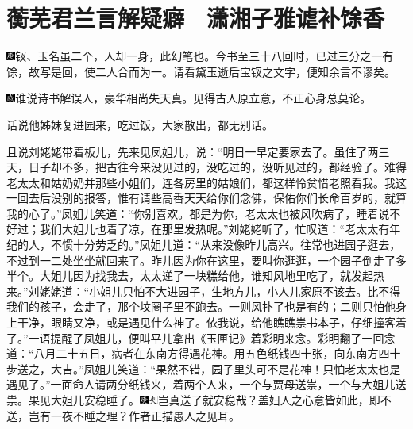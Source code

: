 

\chapter{蘅芜君兰言解疑癖　潇湘子雅谑补馀香}\label{part0046_split_000.htmlux5cux23calibre_pb_0}

{\includegraphics[width=3mm]{../Images/00004}钗、玉名虽二个，人却一身，此幻笔也。今书至三十八回时，已过三分之一有馀，故写是回，使二人合而为一。请看黛玉逝后宝钗之文字，便知余言不谬矣。}

{\includegraphics[width=3mm]{../Images/00005}谁说诗书解误人，豪华相尚失天真。见得古人原立意，不正心身总莫论。}

话说他姊妹复进园来，吃过饭，大家散出，都无别话。

且说刘姥姥带着板儿，先来见凤姐儿，说：``明日一早定要家去了。虽住了两三天，日子却不多，把古往今来没见过的，没吃过的，没听见过的，都经验了。难得老太太和姑奶奶并那些小姐们，连各房里的姑娘们，都这样怜贫惜老照看我。我这一回去后没别的报答，惟有请些高香天天给你们念佛，保佑你们长命百岁的，就算我的心了。''凤姐儿笑道：``你别喜欢。都是为你，老太太也被风吹病了，睡着说不好过；我们大姐儿也着了凉，在那里发热呢。''刘姥姥听了，忙叹道：``老太太有年纪的人，不惯十分劳乏的。''凤姐儿道：``从来没像昨儿高兴。往常也进园子逛去，不过到一二处坐坐就回来了。昨儿因为你在这里，要叫你逛逛，一个园子倒走了多半个。大姐儿因为找我去，太太递了一块糕给他，谁知风地里吃了，就发起热来。''刘姥姥道：``小姐儿只怕不大进园子，生地方儿，小人儿家原不该去。比不得我们的孩子，会走了，那个坟圈子里不跑去。一则风扑了也是有的；二则只怕他身上干净，眼睛又净，或是遇见什么神了。依我说，给他瞧瞧祟书本子，仔细撞客着了。''一语提醒了凤姐儿，便叫平儿拿出《玉匣记》着彩明来念。彩明翻了一回念道：``八月二十五日，病者在东南方得遇花神。用五色纸钱四十张，向东南方四十步送之，大吉。''凤姐儿笑道：``果然不错，园子里头可不是花神！只怕老太太也是遇见了。''一面命人请两分纸钱来，着两个人来，一个与贾母送祟，一个与大姐儿送祟。果见大姐儿安稳睡了。{\includegraphics[width=3mm]{../Images/00004}\includegraphics[width=3mm]{../Images/00012}\footnotesize \kaishu 岂真送了就安稳哉？盖妇人之心意皆如此，即不送，岂有一夜不睡之理？作者正描愚人之见耳。}

